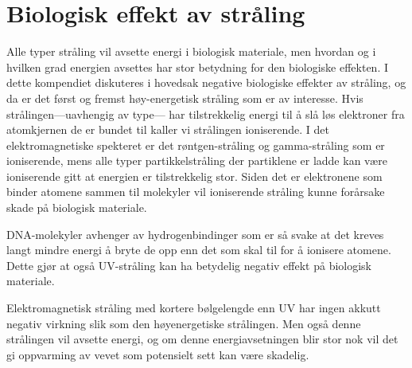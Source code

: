 \documentclass[a4paper,norsk,12pt]{book}
\begin{document}
\section{Biologisk effekt av stråling}
Alle typer stråling vil avsette energi i biologisk materiale, men hvordan og i hvilken grad energien avsettes har stor betydning for den biologiske effekten. I dette kompendiet diskuteres i hovedsak negative biologiske effekter av stråling, og da er det først og fremst høy-energetisk stråling som er av interesse. Hvis strålingen---uavhengig av type--- har tilstrekkelig energi til å slå løs elektroner fra atomkjernen de er bundet til kaller vi strålingen ioniserende. I det elektromagnetiske spekteret er det røntgen-stråling og gamma-stråling som er ioniserende, mens alle typer partikkelstråling der partiklene er ladde kan være ioniserende gitt at energien er tilstrekkelig stor. Siden det er elektronene som binder atomene sammen til molekyler vil ioniserende stråling kunne forårsake skade på biologisk materiale. 

DNA-molekyler avhenger av hydrogenbindinger som er så svake at det kreves langt mindre energi å bryte de opp enn det som skal til for å ionisere atomene. Dette gjør at også UV-stråling kan ha betydelig negativ effekt på biologisk materiale.

Elektromagnetisk stråling med kortere bølgelengde enn UV har ingen akkutt negativ virkning slik som den høyenergetiske strålingen. Men også denne strålingen vil avsette energi, og om denne energiavsetningen blir stor nok vil det gi oppvarming av vevet som potensielt sett kan være skadelig. 





\end{document}

